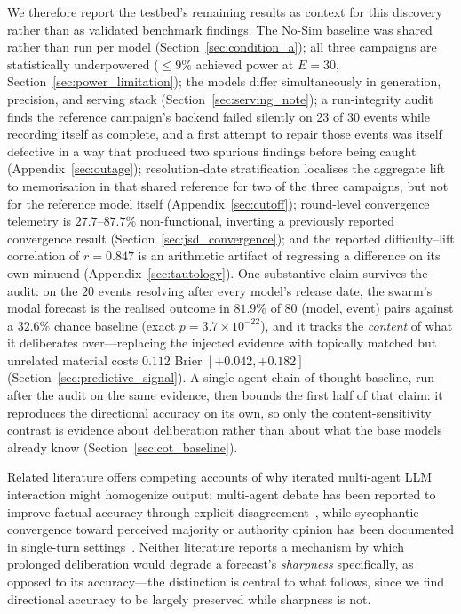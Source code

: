 \documentclass[11pt,journal,onecolumn]{IEEEtran}
\begin{document}
We therefore report the testbed's remaining results as context for this discovery rather than as validated benchmark findings. The No-Sim baseline was shared rather than run per model (Section~\ref{sec:condition_a}); all three campaigns are statistically underpowered ($\leq 9\%$ achieved power at $E=30$, Section~\ref{sec:power_limitation}); the models differ simultaneously in generation, precision, and serving stack (Section~\ref{sec:serving_note}); a run-integrity audit finds the reference campaign's backend failed silently on 23 of 30 events while recording itself as complete, and a first attempt to repair those events was itself defective in a way that produced two spurious findings before being caught (Appendix~\ref{sec:outage}); resolution-date stratification localises the aggregate lift to memorisation in that shared reference for two of the three campaigns, but not for the reference model itself (Appendix~\ref{sec:cutoff}); round-level convergence telemetry is $27.7$--$87.7\%$ non-functional, inverting a previously reported convergence result (Section~\ref{sec:jsd_convergence}); and the reported difficulty--lift correlation of $r=0.847$ is an arithmetic artifact of regressing a difference on its own minuend (Appendix~\ref{sec:tautology}). One substantive claim survives the audit: on the $20$ events resolving after every model's release date, the swarm's modal forecast is the realised outcome in $81.9\%$ of $80$ (model, event) pairs against a $32.6\%$ chance baseline (exact $p = 3.7\times10^{-22}$), and it tracks the \emph{content} of what it deliberates over---replacing the injected evidence with topically matched but unrelated material costs $0.112$ Brier $[+0.042, +0.182]$ (Section~\ref{sec:predictive_signal}). A single-agent chain-of-thought baseline, run after the audit on the same evidence, then bounds the first half of that claim: it reproduces the directional accuracy on its own, so only the content-sensitivity contrast is evidence about deliberation rather than about what the base models already know (Section~\ref{sec:cot_baseline}).

Related literature offers competing accounts of why iterated multi-agent LLM interaction might homogenize output: multi-agent debate has been reported to improve factual accuracy through explicit disagreement~\cite{du2023debate}, while sycophantic convergence toward perceived majority or authority opinion has been documented in single-turn settings~\cite{sharma2023sycophancy}. Neither literature reports a mechanism by which prolonged deliberation would degrade a forecast's \emph{sharpness} specifically, as opposed to its accuracy---the distinction is central to what follows, since we find directional accuracy to be largely preserved while sharpness is not.
\end{document}
